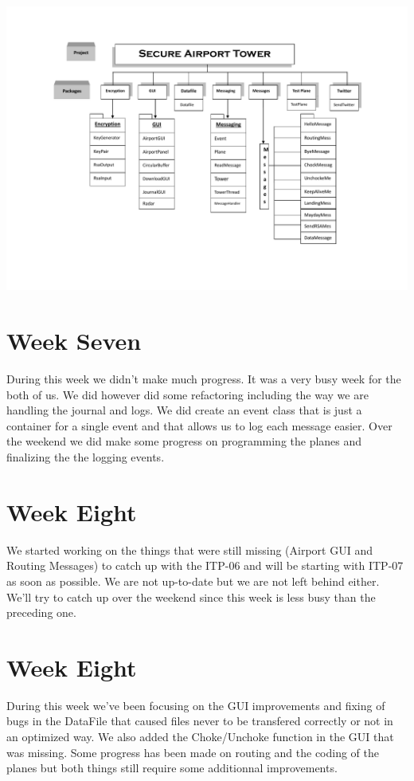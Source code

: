\documentclass{article}
\begin{document}
\includegraphics[scale=0.45]{UML.pdf}
\newpage

\section{Week Seven}
During this week we didn't make much progress. It was a very busy week for the both of us. We did however did some refactoring including the way we are handling the journal and logs. We did create an event class that is just a container for a single event and that allows us to log each message easier. Over the weekend we did make some progress on programming the planes and finalizing the the logging events.
\section{Week Eight}
We started working on the things that were still missing (Airport GUI and Routing Messages) to catch up with the ITP-06 and will be starting with ITP-07 as soon as possible. We are not up-to-date but we are not left behind either. We'll try to catch up over the weekend since this week is less busy than the preceding one.

\section{Week Eight}
During this week we've been focusing on the GUI improvements and fixing of bugs in the DataFile that caused files never to be transfered correctly or not in an optimized way. We also added the Choke/Unchoke function in the GUI that was missing. Some progress has been made on routing and the coding of the planes but both things still require some additionnal improvements.
\end{document}
